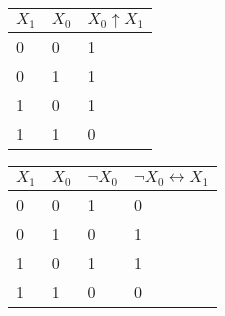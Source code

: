 \documentclass[12pt, a4paper]{article}
\begin{document}
\begin{tabular}{|l|l|l|}
\hline
$X_1$ & $X_0$ & $X_0 \uparrow X_1$\\ \hline
0 & 0 & 1\\
0 & 1 & 1\\
1 & 0 & 1\\
1 & 1 & 0\\
\hline
\end{tabular}

\begin{tabular}{|l|l|l|l|}
\hline
$X_1$ & $X_0$ & $\neg X_0$ & $\neg X_0 \leftrightarrow X_1$\\ \hline
0 & 0 & 1 & 0\\
0 & 1 & 0 & 1\\
1 & 0 & 1 & 1\\
1 & 1 & 0 & 0\\
\hline
\end{tabular}
\end{document}
